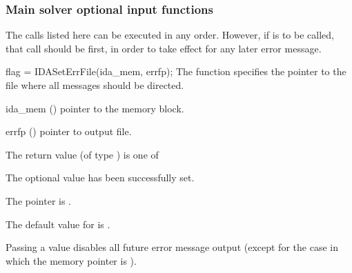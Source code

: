 {\subsubsection{Main solver optional input functions}\label{sss:optin_main}
The calls listed here can be executed in any order. However, if  
is to be called, that call should be first, in order to take effect for any later 
error message.

{
flag = IDASetErrFile(ida\_mem, errfp);
}
{
  The function  specifies the pointer to the file
  where all {\ida} messages should be directed.
}
{
  \begin{args}
  \item[ida\_mem] ()
    pointer to the {\ida} memory block.
  \item[errfp] ()
    pointer to output file.
  \end{args}
}
{
  The return value  (of type ) is one of
  \begin{args}
  \item[\Id{IDA\_SUCCESS}] 
    The optional value has been successfully set.
  \item[\Id{IDA\_MEM\_NULL}]
    The  pointer is .
  \end{args}
}
{
  The default value for  is .

  Passing a value  disables all future error message output
  (except for the case in which the {\ida} memory pointer is ).

}}
